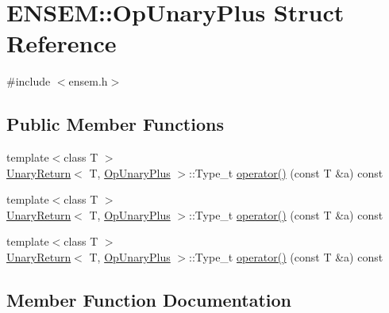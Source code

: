 \hypertarget{structENSEM_1_1OpUnaryPlus}{}\section{E\+N\+S\+EM\+:\+:Op\+Unary\+Plus Struct Reference}
\label{structENSEM_1_1OpUnaryPlus}


{\ttfamily \#include $<$ensem.\+h$>$}

\subsection*{Public Member Functions}
\begin{DoxyCompactItemize}
\item 
{\footnotesize template$<$class T $>$ }\\\mbox{\hyperlink{structENSEM_1_1UnaryReturn}{Unary\+Return}}$<$ T, \mbox{\hyperlink{structENSEM_1_1OpUnaryPlus}{Op\+Unary\+Plus}} $>$\+::Type\+\_\+t \mbox{\hyperlink{structENSEM_1_1OpUnaryPlus_a508ecfc90631234c54b97cb705b14bc5}{operator()}} (const T \&a) const
\item 
{\footnotesize template$<$class T $>$ }\\\mbox{\hyperlink{structENSEM_1_1UnaryReturn}{Unary\+Return}}$<$ T, \mbox{\hyperlink{structENSEM_1_1OpUnaryPlus}{Op\+Unary\+Plus}} $>$\+::Type\+\_\+t \mbox{\hyperlink{structENSEM_1_1OpUnaryPlus_a508ecfc90631234c54b97cb705b14bc5}{operator()}} (const T \&a) const
\item 
{\footnotesize template$<$class T $>$ }\\\mbox{\hyperlink{structENSEM_1_1UnaryReturn}{Unary\+Return}}$<$ T, \mbox{\hyperlink{structENSEM_1_1OpUnaryPlus}{Op\+Unary\+Plus}} $>$\+::Type\+\_\+t \mbox{\hyperlink{structENSEM_1_1OpUnaryPlus_a508ecfc90631234c54b97cb705b14bc5}{operator()}} (const T \&a) const
\end{DoxyCompactItemize}


\subsection{Member Function Documentation}
\mbox{\label{structENSEM_1_1OpUnaryPlus_a508ecfc90631234c54b97cb705b14bc5}} 
